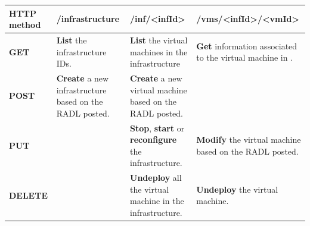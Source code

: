 \documentclass[letterpaper,10pt,english]{sphinxmanual}
\begin{document}
\begin{tabulary}{\linewidth}{|L|L|L|L|}
\hline
\textsf{\relax 
HTTP method
} & \textsf{\relax 
/infrastructure
} & \textsf{\relax 
/inf/\textless{}infId\textgreater{}
} & \textsf{\relax 
/vms/\textless{}infId\textgreater{}/\textless{}vmId\textgreater{}
}\\
\hline
\textbf{GET}
 & 
\textbf{List} the
infrastructure
IDs.
 & 
\textbf{List} the
virtual machines
in the
infrastructure
 & 
\textbf{Get} information
associated to the
virtual machine
 in .
\\
\hline
\textbf{POST}
 & 
\textbf{Create} a new
infrastructure
based on the RADL
posted.
 & 
\textbf{Create} a new
virtual machine
based on the RADL
posted.
 & \\
\hline
\textbf{PUT}
 &  & 
\textbf{Stop},
\textbf{start} or
\textbf{reconfigure}
the
infrastructure.
 & 
\textbf{Modify} the virtual
machine based on the
RADL posted.
\\
\hline
\textbf{DELETE}
 &  & 
\textbf{Undeploy} all
the virtual
machine in the
infrastructure.
 & 
\textbf{Undeploy} the
virtual machine.
\\
\hline\end{tabulary}
\end{document}
